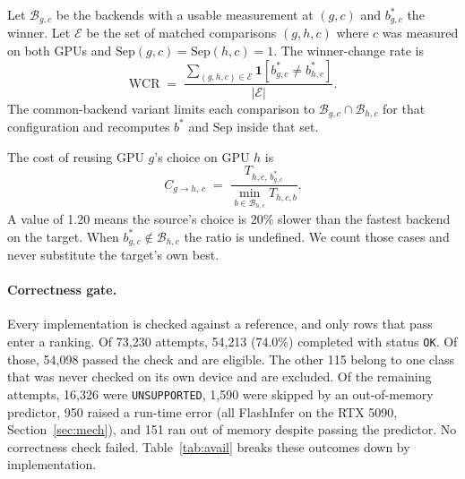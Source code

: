 \documentclass[11pt]{article}
\newcommand{\code}[1]{\texttt{\small #1}}
\begin{document}
Let $\mathcal{B}_{g,c}$ be the backends with a usable measurement at $(g,c)$ and
$b^{*}_{g,c}$ the winner. Let $\mathcal{E}$ be the set of matched comparisons
$(g,h,c)$ where $c$ was measured on both GPUs and
$\mathrm{Sep}(g,c) = \mathrm{Sep}(h,c) = 1$. The winner-change rate is
%
\begin{equation}
\mathrm{WCR} \;=\;
\frac{\sum_{(g,h,c)\in\mathcal{E}} \mathbf{1}\!\left[b^{*}_{g,c} \neq b^{*}_{h,c}\right]}
     {\lvert \mathcal{E} \rvert} .
\label{eq:wcr}
\end{equation}
%
The common-backend variant limits each comparison to
$\mathcal{B}_{g,c} \cap \mathcal{B}_{h,c}$ for that configuration and
recomputes $b^{*}$ and $\mathrm{Sep}$ inside that set.

The cost of reusing GPU $g$'s choice on GPU $h$ is
%
\begin{equation}
C_{g \rightarrow h,\,c} \;=\;
\frac{T_{h,c,\,b^{*}_{g,c}}}{\min_{b \in \mathcal{B}_{h,c}} T_{h,c,b}} .
\label{eq:transfer}
\end{equation}
%
A value of 1.20 means the source's choice is 20\% slower than the fastest
backend on the target. When $b^{*}_{g,c} \notin \mathcal{B}_{h,c}$ the ratio is
undefined. We count those cases and never substitute the target's own best.

\paragraph{Correctness gate.} Every implementation is checked against a
reference, and only rows that pass enter a ranking. Of 73{,}230 attempts,
54{,}213 (74.0\%) completed with status \code{OK}. Of those, 54{,}098 passed
the check and are eligible. The other 115 belong to one class that was never
checked on its own device and are excluded. Of the remaining attempts, 16{,}326
were \code{UNSUPPORTED}, 1{,}590 were skipped by an out-of-memory predictor,
950 raised a run-time error (all FlashInfer on the RTX 5090,
Section~\ref{sec:mech}), and 151 ran out of memory despite passing the
predictor. No correctness check failed. Table~\ref{tab:avail} breaks these
outcomes down by implementation.
\end{document}

